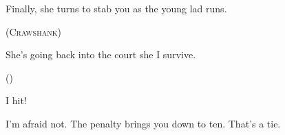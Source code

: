 {{\begin{description}
      Finally, she turns to stab you as the young lad runs.

      \bigLine\par
      \setcounter{ap}{0}
      \setcounter{dr}{0}
      \togglefalse{allyCharacter}
      \setcounter{covering}{0}
      \setcounter{toHit}{10}
      \setcounter{hp}{8}
      {\scshape (Crawshank)}
      \par\nobreak\derivedstats

      \item[Player 1:]
      She's going back into the \gls{court} she I survive.

      \bigLine\par
      \setcounter{ap}{-2}
      \setcounter{dr}{3}
      \setcounter{covering}{3}
      \toggletrue{allyCharacter}
      \setcounter{att}{-1}
      \setcounter{damage}{2}
      \setcounter{hp}{8}
      {\scshape (\currentName)}\smallbreak
      \par\noindent \derivedstats

      I hit!
      \item[\Gls{gm}:]
      I'm afraid not.
      The  penalty brings you down to ten.
      That's a tie.

    \end{description}
  }{}
}

\newcommand\cavePic{
  \clearpage
  \pagestyle{empty}
  \label{Roch_Hercka/cave_fight}
  \widePic[t]{extracted/cave-0}

  \widePic[t]{extracted/cave-1}

  \clearpage
  \pagestyle{plain}
}

